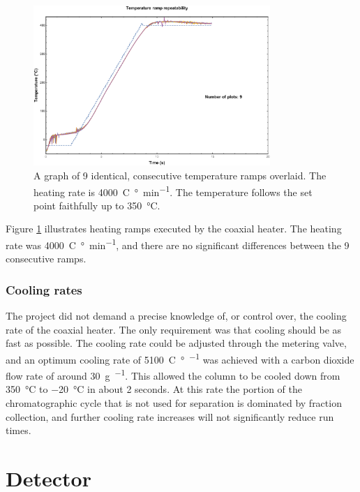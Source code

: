 \begin{figure}
	\centering
	\includegraphics[width=0.8\textwidth]{Figures/high_rate_heating.pdf}
	\decoRule
		
	\caption[Heating rate illustration]{A graph of 9 identical, consecutive
	temperature ramps overlaid. The heating rate is \SI{4000}{C\degree\per\minute}.
	The temperature follows the set point faithfully up to \SI{350}{\celsius}.}

	\label{fig:4000K/min} 
\end{figure}

Figure \ref{fig:4000K/min} illustrates heating ramps executed by the coaxial
heater. The heating rate was \SI{4000}{C\degree\per\minute}, and there are no
significant differences between the 9 consecutive ramps.

\subsubsection{Cooling rates}

The project did not demand a precise knowledge of, or control over, the cooling
rate of the coaxial heater. The only requirement was that cooling should be as
fast as possible. The cooling rate could be adjusted through the metering valve,
and an optimum cooling rate of \SI{5100}{C\degree\per\min} was achieved with a
carbon dioxide flow rate of around \SI{30}{\gram\per\min}. This allowed the
column to be cooled down from \SI{350}{\celsius} to \SI{-20}{\celsius} in about
2 seconds. At this rate the portion of the chromatographic cycle that is not
used for separation is dominated by fraction collection, and further cooling
rate increases will not significantly reduce run times.

\section{Detector}

